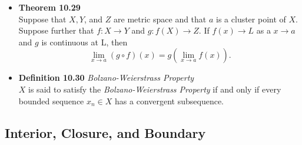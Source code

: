 \documentclass[11pt,a4paper]{article}
\begin{document}
\begin{itemize}
    \item \textbf{Theorem 10.29} \\
        Suppose that $X, Y$, and $Z$ are metric space and that $a$ is a cluster point of $X$.
        Suppose further that $f : X \to Y$ and $g : f(X) \to Z$.
        If $f(x) \to L$ as a $x \to a$ and $g$ is continuous at L, then
        \[
            \lim_{x \to a} (g \circ f) (x) = g \left( \lim_{x \to a} f(x) \right).
        \]

    \item \textbf{Definition 10.30} \emph{Bolzano-Weierstrass Property} \\
        $X$ is said to satisfy the \emph{Bolzano-Weierstrass Property} if and only if every
        bounded sequence $x_n \in X$ has a convergent subsequence.

\end{itemize}

\subsection{Interior, Closure, and Boundary}
\end{document}
